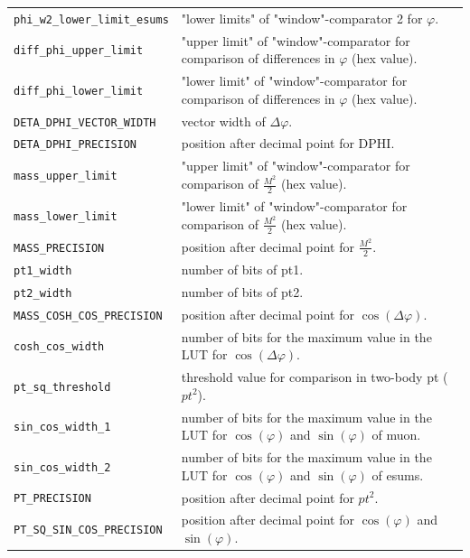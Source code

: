 \begin{longtable}{>{\footnotesize}l >{\footnotesize}p{}}
\verb|phi_w2_lower_limit_esums| & "lower limits" of "window"-comparator 2 for $\varphi$.\\
\verb|diff_phi_upper_limit| & "upper limit" of "window"-comparator for comparison of differences in $\varphi$ (hex value).\\
\verb|diff_phi_lower_limit| & "lower limit" of "window"-comparator for comparison of differences in $\varphi$ (hex value).\\
\verb|DETA_DPHI_VECTOR_WIDTH| & vector width of $\Delta\varphi$.\\
\verb|DETA_DPHI_PRECISION| & position after decimal point for DPHI.\\
\verb|mass_upper_limit| & "upper limit" of "window"-comparator for comparison of $\frac{M^2}{2}$ (hex value).\\
\verb|mass_lower_limit| & "lower limit" of "window"-comparator for comparison of $\frac{M^2}{2}$ (hex value).\\
\verb|MASS_PRECISION| & position after decimal point for $\frac{M^2}{2}$.\\
\verb|pt1_width| & number of bits of pt1.\\
\verb|pt2_width| & number of bits of pt2.\\
\verb|MASS_COSH_COS_PRECISION| & position after decimal point for $\cos(\Delta\varphi)$.\\
\verb|cosh_cos_width| & number of bits for the maximum value in the LUT for $\cos(\Delta\varphi)$.\\
\verb|pt_sq_threshold| & threshold value for comparison in two-body pt (${pt^2}$).\\
\verb|sin_cos_width_1| & number of bits for the maximum value in the LUT for $\cos(\varphi)$ and $\sin(\varphi)$ of muon.\\
\verb|sin_cos_width_2| & number of bits for the maximum value in the LUT for $\cos(\varphi)$ and $\sin(\varphi)$ of esums.\\
\verb|PT_PRECISION| & position after decimal point for ${pt^2}$.\\
\verb|PT_SQ_SIN_COS_PRECISION| & position after decimal point for $\cos(\varphi)$ and $\sin(\varphi)$.\\


\end{longtable}

